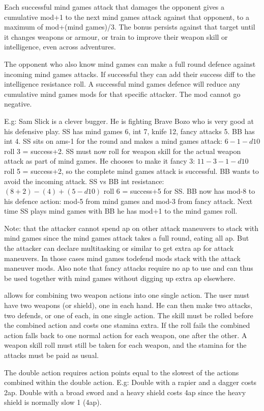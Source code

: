 Each successful mind games attack that damages the opponent gives a cumulative mod+1 to the next mind games attack against that opponent, to a maximum of mod+(mind games)/3. The bonus persists against that target until it changes weapons or armour, or train to improve their weapon skill or intelligence, even across adventures.

The opponent who also know mind games can make a full round defence against incoming mind games attacks. If successful they can add their success diff to the intelligence resistance roll. A successful mind games defence will reduce any cumulative mind games mods for that specific attacker. The mod cannot go negative.

E.g: Sam Slick is a clever bugger. He is fighting Brave Bozo who is very good at his defensive play. SS has mind games 6, int 7, knife 12, fancy attacks 5. BB has int 4. SS sits on ams-1 for the round and makes a mind games attack: $6 -1 -d10$ roll 3 = success+2. SS must now roll for weapon skill for the actual weapon attack as part of mind games. He chooses to make it fancy 3: $11 -3 -1 -d10$ roll 5 = success+2, so the complete mind games attack is successful. BB wants to avoid the incoming attack. SS vs BB int resistance: $(8 +2) - (4) + (5-d10)$ roll 6 = success+5 for SS.
BB now has mod-8 to his defence action: mod-5 from mind games and mod-3 from fancy attack.
Next time SS plays mind games with BB he has mod+1 to the mind games roll.

Note: that the attacker cannot spend ap on other attack maneuvers to stack with mind games since the mind games attack takes a full round, eating all ap. But the attacker can declare multitasking or similar to get extra ap for attack maneuvers. In those cases mind games todefend mods stack with the attack maneuver mods. Also note that fancy attacks require no ap to use and can thus be used together with mind games without digging up extra ap elsewhere.


 allows for combining two weapon actions into one single action. The user must have two weapons (or shield), one in each hand. He can then make two attacks, two defends, or one of each, in one single action. The skill must be rolled before the combined action and costs one stamina extra. If the roll fails the combined action falls back to one normal action for each weapon, one after the other. A weapon skill roll must still be taken for each weapon, and the stamina for the attacks must be paid as usual.

The double action requires action points equal to the slowest of the actions combined within the double action. E.g: Double with a rapier and a dagger costs 2ap. Double with a broad sword and a heavy shield costs 4ap since the heavy shield is normally slow 1 (4ap).

